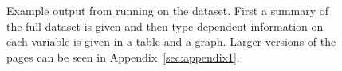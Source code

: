 \documentclass[article,shortnames]{jss}
\begin{document}
\begin{figure}[tb]
\begin{center}
%
\end{center}
\caption{Example output from running  on the 
  dataset. First a summary of the full dataset is given and then
  type-dependent information on each variable is given in a table and
  a graph. Larger versions of the pages can be seen in
  Appendix~\ref{sec:appendix1}.}
\label{fig:example1}
\end{figure}
\end{document}
